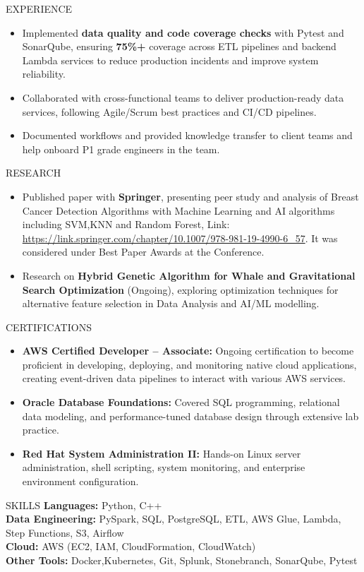\documentclass[10pt]{resume}
\begin{document}
\begin{rSection}{EXPERIENCE}
\begin{itemize}
  \item Implemented \textbf{data quality and code coverage checks} with Pytest and SonarQube, ensuring \textbf{75\%+} coverage across ETL pipelines and backend Lambda services to reduce production incidents and improve system reliability.
  \item Collaborated with cross-functional teams to deliver production-ready data services, following Agile/Scrum best practices and CI/CD pipelines.
  \item Documented workflows and provided knowledge transfer to client teams and help onboard P1 grade engineers in the team.
\end{itemize}
\end{rSection}

\begin{rSection}{RESEARCH}
\begin{itemize}
  \item Published paper with \textbf{Springer}, presenting peer study and analysis of Breast Cancer Detection Algorithms with Machine Learning and AI algorithms including SVM,KNN and Random Forest, Link: \href{https://link.springer.com/chapter/10.1007/978-981-19-4990-6_57}{https://link.springer.com/chapter/10.1007/978-981-19-4990-6\_57}. It was considered under Best Paper Awards at the Conference.
  \item  Research on \textbf{Hybrid Genetic Algorithm for Whale and Gravitational Search Optimization} (Ongoing), exploring optimization techniques for alternative feature selection in Data Analysis and AI/ML modelling.
\end{itemize}
\end{rSection}

\begin{rSection}{CERTIFICATIONS}
\begin{itemize}
  \item \textbf{AWS Certified Developer – Associate:} Ongoing certification to become proficient in developing, deploying, and monitoring native cloud applications, creating event-driven data pipelines to interact with various AWS services.
  \item \textbf{Oracle Database Foundations:} Covered SQL programming, relational data modeling, and performance-tuned database design through extensive lab practice.
  \item \textbf{Red Hat System Administration II:} Hands-on Linux server administration, shell scripting, system monitoring, and enterprise environment configuration.
\end{itemize}
\end{rSection}

\begin{rSection}{SKILLS}
\textbf{Languages:} Python, C++ \\
\textbf{Data Engineering:} PySpark, SQL, PostgreSQL, ETL, AWS Glue, Lambda, Step Functions, S3, Airflow \\
\textbf{Cloud:} AWS (EC2, IAM, CloudFormation, CloudWatch) \\
\textbf{Other Tools:} Docker,Kubernetes, Git, Splunk, Stonebranch, SonarQube, Pytest
\end{rSection}
\end{document}
